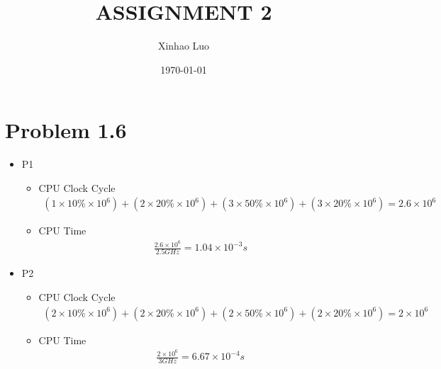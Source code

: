 \documentclass{article}
\title{\bf \Large ASSIGNMENT 2}
\author{Xinhao Luo}
\date{\today}
\begin{document}
\maketitle
\medskip

\section{Problem 1.6}

\begin{itemize}
    \item P1 
    \begin{itemize}
        \item CPU Clock Cycle
            \begin{equation}
                \begin{split}
                   (1 \times 10\% \times 10^6) + (2 \times 20\% \times 10^6) + (3 \times 50\% \times 10^6) + (3 \times 20\% \times 10^6) = 2.6 \times 10^6
                \end{split}
            \end{equation}
        \item CPU Time
            \begin{equation}
                \begin{split}
                  \frac{2.6 \times 10^6}{2.5 GHz} = 1.04 \times 10^{-3} s
                \end{split}
            \end{equation}
    \end{itemize}
    \item P2
        \begin{itemize}
        \item CPU Clock Cycle
            \begin{equation}
                \begin{split}
                   (2 \times 10\% \times 10^6) + (2 \times 20\% \times 10^6) + (2 \times 50\% \times 10^6) + (2 \times 20\% \times 10^6) = 2 \times 10^6
                \end{split}
            \end{equation}
        \item CPU Time
            \begin{equation}
                \begin{split}
                  \frac{2 \times 10^6}{3 GHz} = 6.67 \times 10^{-4} s
                \end{split}
            \end{equation}
    \end{itemize}
\end{itemize}
\end{document}
